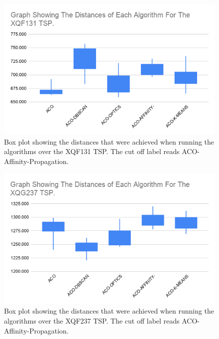 \begin{figure}
    \centering
    \includegraphics[width=\textwidth]{figures/distance_xqf131_graph.png}
    \caption{Box plot showing the distances that were achieved when running the algorithms over the XQF131 TSP. The cut off label reads ACO-Affinity-Propagation.}
    \label{fig:distance_xqf131}
\end{figure}

\begin{figure}
    \centering
    \includegraphics[width=\textwidth]{figures/distance_xqg237_graph.png}
    \caption{Box plot showing the distances that were achieved when running the algorithms over the XQF237 TSP. The cut off label reads ACO-Affinity-Propagation.}
    \label{fig:distance_xqg237}
\end{figure}

